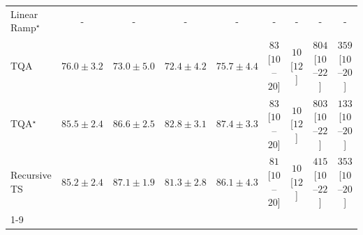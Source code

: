 \begin{tabular}{l|cccc|cccc|}
Linear Ramp$^\star$ & {\cellcolor[HTML]{000000}} \color[HTML]{F1F1F1} {\cellcolor{white}} \color{black} - & {\cellcolor[HTML]{000000}} \color[HTML]{F1F1F1} {\cellcolor{white}} \color{black} - & {\cellcolor[HTML]{000000}} \color[HTML]{F1F1F1} {\cellcolor{white}} \color{black} - & {\cellcolor[HTML]{000000}} \color[HTML]{F1F1F1} {\cellcolor{white}} \color{black} - & {\cellcolor[HTML]{000000}} \color[HTML]{F1F1F1} {\cellcolor{white}} \color{black} - & {\cellcolor[HTML]{000000}} \color[HTML]{F1F1F1} {\cellcolor{white}} \color{black} - & {\cellcolor[HTML]{000000}} \color[HTML]{F1F1F1} {\cellcolor{white}} \color{black} - & {\cellcolor[HTML]{000000}} \color[HTML]{F1F1F1} {\cellcolor{white}} \color{black} - \\
TQA & {\cellcolor[HTML]{94B6D7}} \color[HTML]{000000} $76.0\pm 3.2$ & {\cellcolor[HTML]{C6CCE3}} \color[HTML]{000000} $73.0\pm 5.0$ & {\cellcolor[HTML]{D0D1E6}} \color[HTML]{000000} $72.4\pm 4.2$ & {\cellcolor[HTML]{99B8D8}} \color[HTML]{000000} $75.7\pm 4.4$ & {\cellcolor[HTML]{FEE6E3}} \color[HTML]{000000} $83$ [$10$--$20$] & {\cellcolor[HTML]{FFF7F3}} \color[HTML]{000000} $10$ [$12$] & {\cellcolor[HTML]{49006A}} \color[HTML]{F1F1F1} $804$ [$10$--$22$] & {\cellcolor[HTML]{F883AB}} \color[HTML]{F1F1F1} $359$ [$10$--$20$] \\
TQA$^\star$ & {\cellcolor[HTML]{045A8D}} \color[HTML]{F1F1F1} $85.5\pm 2.4$ & {\cellcolor[HTML]{034C78}} \color[HTML]{F1F1F1} $86.6\pm 2.5$ & {\cellcolor[HTML]{0771B1}} \color[HTML]{F1F1F1} $82.8\pm 3.1$ & {\cellcolor[HTML]{034267}} \color[HTML]{F1F1F1} $87.4\pm 3.3$ & {\cellcolor[HTML]{FEE6E3}} \color[HTML]{000000} $83$ [$10$--$20$] & {\cellcolor[HTML]{FFF7F3}} \color[HTML]{000000} $10$ [$12$] & {\cellcolor[HTML]{49006A}} \color[HTML]{F1F1F1} $803$ [$10$--$22$] & {\cellcolor[HTML]{FDDAD7}} \color[HTML]{000000} $133$ [$10$--$20$] \\
Recursive TS & {\cellcolor[HTML]{045D92}} \color[HTML]{F1F1F1} $85.2\pm 2.4$ & {\cellcolor[HTML]{03466E}} \color[HTML]{F1F1F1} $87.1\pm 1.9$ & {\cellcolor[HTML]{2383BA}} \color[HTML]{F1F1F1} $81.3\pm 2.8$ & {\cellcolor[HTML]{045382}} \color[HTML]{F1F1F1} $86.1\pm 4.3$ & {\cellcolor[HTML]{FEE7E4}} \color[HTML]{000000} $81$ [$10$--$20$] & {\cellcolor[HTML]{FFF7F3}} \color[HTML]{000000} $10$ [$12$] & {\cellcolor[HTML]{F564A0}} \color[HTML]{F1F1F1} $415$ [$10$--$22$] & {\cellcolor[HTML]{F986AC}} \color[HTML]{F1F1F1} $353$ [$10$--$20$] \\
\cline{1-9}
\bottomrule
\end{tabular}
